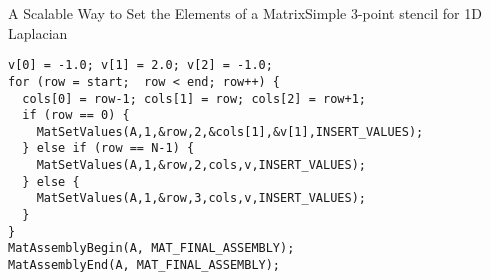 \begin{frame}[fragile]{A Scalable Way to Set the Elements of a Matrix}{Simple 3-point stencil for 1D Laplacian}
\small
\begin{verbatim}
v[0] = -1.0; v[1] = 2.0; v[2] = -1.0;
for (row = start;  row < end; row++) {
  cols[0] = row-1; cols[1] = row; cols[2] = row+1;
  if (row == 0) {
    MatSetValues(A,1,&row,2,&cols[1],&v[1],INSERT_VALUES);
  } else if (row == N-1) {
    MatSetValues(A,1,&row,2,cols,v,INSERT_VALUES);
  } else {
    MatSetValues(A,1,&row,3,cols,v,INSERT_VALUES);
  }
}
MatAssemblyBegin(A, MAT_FINAL_ASSEMBLY);
MatAssemblyEnd(A, MAT_FINAL_ASSEMBLY);
\end{verbatim}
\end{frame}
